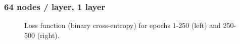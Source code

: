 \documentclass{beamer}
\begin{document}
\begin{frame}
  \frametitle{64 nodes / layer, 1 layer}

    \begin{figure}[htb]
    \centering

    \caption{Loss function (binary cross-entropy) for epochs 1-250 (left) and 250-500 (right).}
  \end{figure}

\end{frame}
\end{document}
